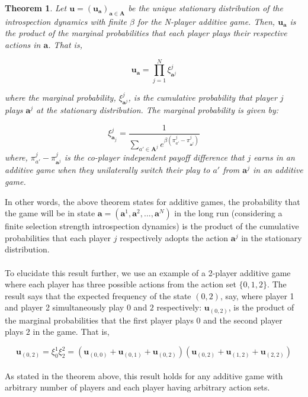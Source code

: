 \documentclass[11pt]{article}
\theoremstyle{plainCl1}
\newtheorem{theorem}{Theorem}
\theoremstyle{plainCl2}
\newcommand{\A}{\mathbf{A}}
\newcommand{\abf}{\mathbf{a}}
\newcommand{\ubf}{\mathbf{u}}
\begin{document}
\begin{theorem}
Let $\ubf = (\ubf_\abf)_{\abf \in \A}$ be the unique stationary distribution of the introspection dynamics with finite $\beta$ for the N-player additive game. Then, $\ubf_\abf$ is the product of the marginal probabilities that each player plays their respective actions in $\abf$. That is, 

\begin{equation}
\ubf_\abf = \prod_{j = 1}^N \xi^j_{\abf^j}
\label{Eq:additive-game-products}
\end{equation}

\noindent where the marginal probability, $\xi^j_{\abf^j}$, is the cumulative probability that player $j$ plays $\abf^j$ at the stationary distribution. The marginal probability is given by: 

\begin{equation}
\xi^j_{\abf_j} = \frac{1}{\displaystyle \sum_{a' \in \A^j} e^{\beta \left( \pi^j_{a'} -  \pi^j_{\abf^j} \right) }} 
\label{Eq:marginal-at-additive-game}
\end{equation}
\noindent where, $\pi^j_{a'} - \pi^j_{\abf^j}$ is the co-player independent payoff difference that $j$  earns in an additive game when they unilaterally switch their play to $a'$ from $\abf^j$ in an additive game.
\label{Th:additive-game-product-of-marginals}
\end{theorem}

\noindent In other words, the above theorem states for additive games, the probability that the game will be in state $\abf = (\abf^1, \abf^2, ...,\abf^N)$ in the long run (considering a finite selection strength introspection dynamics) is the product of the cumulative probabilities that each player $j$ respectively adopts the action $\abf^j$ in the stationary distribution. \\ \\
\noindent To elucidate this result further, we use an example of a 2-player additive game where each player has three possible actions from the action set $\{\mathit{0},\mathit{1},\mathit{2}\}$. The result says that the expected frequency of the state $(\mathit{0,2})$, say, where player 1 and player 2 simultaneously play $\mathit{0}$ and $\mathit{2}$ respectively: $\ubf_{(\mathit{0,2})}$, is the product of the marginal probabilities that the first player plays $\mathit{0}$ and the second player plays $\mathit{2}$ in the game. That is, 

\begin{equation}
\ubf_{(\mathit{0,2})} = \xi^1_{\mathit{0}}  \xi^2_{\mathit{2}} = (\ubf_{(\mathit{0,0})} + \ubf_{(\mathit{0,1})} + \ubf_{(\mathit{0,2})})(\ubf_{(\mathit{0,2})} + \ubf_{(\mathit{1,2})} + \ubf_{(\mathit{2,2})}) 
\label{Eq:additive-stationary-dist-example}
\end{equation}
\\
\noindent As stated in the theorem above, this result holds for any additive game with arbitrary number of players and each player having arbitrary action sets.
\end{document}
